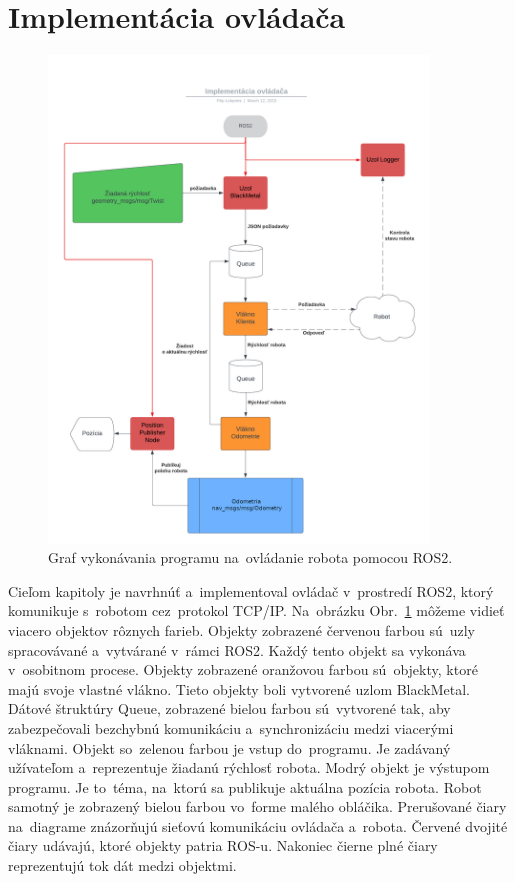 
\section{Implementácia ovládača}
\label{sec:program}

\begin{figure}[!htbp]
	\begin{center}
		\includegraphics[width=0.9\textwidth]{img/BlackMetal_flowchart.png}
	\end{center}
	\caption{Graf vykonávania programu na~ovládanie robota pomocou ROS2.}
	\label{fig:flowchart}
\end{figure}

Cieľom kapitoly je navrhnúť a~implementoval ovládač v~prostredí ROS2, ktorý komunikuje s~robotom
cez~protokol TCP/IP. Na~obrázku Obr.~\ref{fig:flowchart} môžeme vidieť viacero objektov rôznych
farieb. Objekty zobrazené červenou farbou sú~uzly spracovávané a~vytvárané v~rámci ROS2. Každý
tento objekt sa vykonáva v~osobitnom procese. Objekty zobrazené oranžovou farbou sú~objekty, ktoré
majú svoje vlastné vlákno. Tieto objekty boli vytvorené uzlom BlackMetal. Dátové štruktúry Queue,
zobrazené bielou farbou sú~vytvorené tak, aby zabezpečovali bezchybnú komunikáciu a~synchronizáciu
medzi viacerými vláknami. Objekt so~zelenou farbou je vstup do~programu. Je zadávaný užívateľom
a~reprezentuje žiadanú rýchlosť robota. Modrý objekt je výstupom programu. Je to~téma, na~ktorú
sa publikuje aktuálna pozícia robota. Robot samotný je zobrazený bielou farbou vo~forme malého
obláčika. Prerušované čiary na~diagrame znázorňujú sieťovú komunikáciu ovládača a~robota. Červené
dvojité čiary udávajú, ktoré objekty patria ROS-u. Nakoniec čierne plné čiary reprezentujú tok dát
medzi objektmi.

